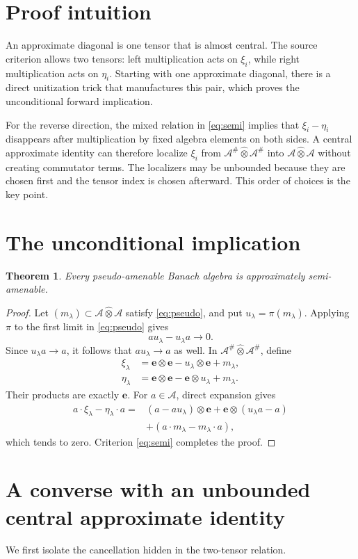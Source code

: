 \documentclass[11pt]{article}
\newtheorem{theorem}{Theorem}[section]
\newcommand{\A}{\mathcal A}
\newcommand{\Ah}{\mathcal A^{\#}}
\newcommand{\tp}{\widehat\otimes}
\newcommand{\e}{\mathbf e}
\begin{document}
\section{Proof intuition}
An approximate diagonal is one tensor that is almost central.  The source
criterion allows two tensors: left multiplication acts on $\xi_i$, while
right multiplication acts on $\eta_i$.  Starting with one approximate
diagonal, there is a direct unitization trick that manufactures this pair,
which proves the unconditional forward implication.

For the reverse direction, the mixed relation in \eqref{eq:semi} implies that
$\xi_i-\eta_i$ disappears after multiplication by fixed algebra elements on
both sides.  A central approximate identity can therefore localize $\xi_i$
from $\Ah\tp\Ah$ into $\A\tp\A$ without creating commutator terms.  The
localizers may be unbounded because they are chosen first and the tensor
index is chosen afterward.  This order of choices is the key point.

\section{The unconditional implication}
\begin{theorem}\label{thm:forward}
Every pseudo-amenable Banach algebra is approximately semi-amenable.
\end{theorem}
\begin{proof}
Let $(m_\lambda)\subset\A\tp\A$ satisfy \eqref{eq:pseudo}, and put
$u_\lambda=\pi(m_\lambda)$.  Applying $\pi$ to the first limit in
\eqref{eq:pseudo} gives
\[
 au_\lambda-u_\lambda a\longrightarrow0.
\]
Since $u_\lambda a\to a$, it follows that $au_\lambda\to a$ as well.  In
$\Ah\tp\Ah$, define
\begin{align*}
 \xi_\lambda&=\e\otimes\e-u_\lambda\otimes\e+m_\lambda,\\
 \eta_\lambda&=\e\otimes\e-\e\otimes u_\lambda+m_\lambda.
\end{align*}
Their products are exactly $\e$.  For $a\in\A$, direct expansion gives
\begin{align*}
 a\cdot\xi_\lambda-\eta_\lambda\cdot a
  ={}&(a-au_\lambda)\otimes\e
      +\e\otimes(u_\lambda a-a)\\
    &+(a\cdot m_\lambda-m_\lambda\cdot a),
\end{align*}
which tends to zero.  Criterion \eqref{eq:semi} completes the proof.
\end{proof}

\section{A converse with an unbounded central approximate identity}
We first isolate the cancellation hidden in the two-tensor relation.
\end{document}

